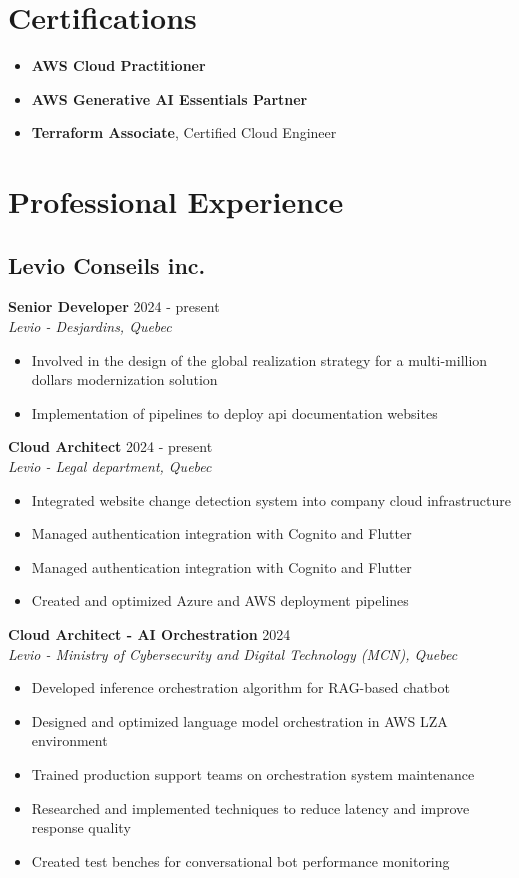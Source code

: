﻿\documentclass[11pt,letterpaper]{article}
\begin{document}
\section*{Certifications}
\begin{itemize}[leftmargin=1.5em]
  \item \textbf{AWS Cloud Practitioner}
  \item \textbf{AWS Generative AI Essentials Partner}
  \item \textbf{Terraform Associate}, Certified Cloud Engineer
\end{itemize}

\section*{Professional Experience}

\subsection*{Levio Conseils inc.}

\textbf{Senior Developer} \hfill 2024 - present\\
\textit{Levio - Desjardins, Quebec}
\begin{itemize}
\item Involved in the design of the global realization strategy for a multi-million dollars modernization solution
\item Implementation of pipelines to deploy api documentation websites
\end{itemize}

\textbf{Cloud Architect} \hfill 2024 - present\\
\textit{Levio - Legal department, Quebec}
\begin{itemize}
\item Integrated website change detection system into company cloud infrastructure
\item Managed authentication integration with Cognito and Flutter
\item Managed authentication integration with Cognito and Flutter
\item Created and optimized Azure and AWS deployment pipelines
\end{itemize}

\textbf{Cloud Architect - AI Orchestration} \hfill 2024\\
\textit{Levio - Ministry of Cybersecurity and Digital Technology (MCN), Quebec}
\begin{itemize}
\item Developed inference orchestration algorithm for RAG-based chatbot
\item Designed and optimized language model orchestration in AWS LZA environment
\item Trained production support teams on orchestration system maintenance
\item Researched and implemented techniques to reduce latency and improve response quality
\item Created test benches for conversational bot performance monitoring
\end{itemize}
\end{document}
